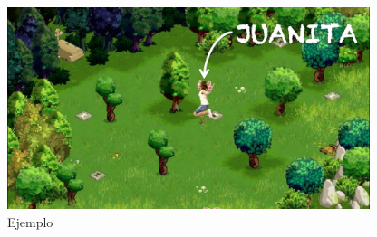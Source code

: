 \begin{itemize}
\begin{figure}[H] %
\begin{center}
\includegraphics[width=300pt]{../imgs/ej1ejemp4.jpg}
\caption{Ejemplo}
\end{center}
\end{figure}

\end{itemize}
